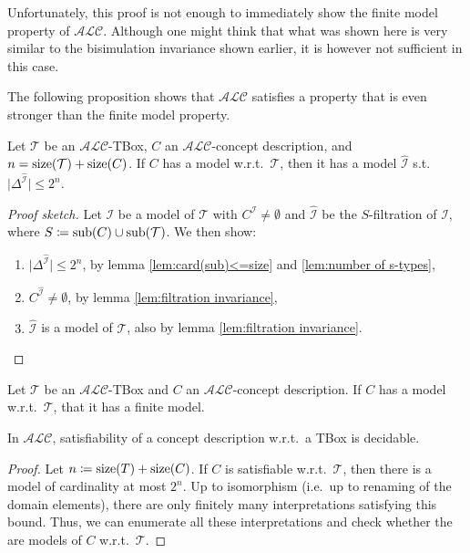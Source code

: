 Unfortunately, this proof is not enough to immediately show the finite model property of $\mathcal{ALC}$.
Although one might think that what was shown here is very similar to the bisimulation invariance shown earlier,
it is however not sufficient in this case.

The following proposition shows that $\mathcal{ALC}$ satisfies a property that is even stronger than the finite model property.
\begin{theorem}
	Let $\mathcal{T}$ be an $\mathcal{ALC}$-TBox, $C$ an $\mathcal{ALC}$-concept description, and $n = \operatorname{\text{size}}(\mathcal{T}) + \operatorname{\text{size}}(C)$.
	If $C$ has a model w.r.t.\ $\mathcal{T}$, then it has a model $\widehat{\mathcal{I}}$ s.t. $\lvert \Delta^{\widehat{\mathcal{I}}} \rvert \leq 2^n$.
\end{theorem}
\begin{proof}[Proof sketch]
	Let $\mathcal{I}$ be a model of $\mathcal{T}$ with $C^{\mathcal{I}} \neq \emptyset$ and $\widehat{\mathcal{I}}$ be the $S$-filtration of $\mathcal{I}$,
	where $S \coloneqq \operatorname{\text{sub}}(C) \cup \operatorname{\text{sub}}(\mathcal{T})$.
	We then show:
	\begin{enumerate}
		\item $\lvert \Delta^{\widehat{\mathcal{I}}} \rvert \leq 2^{n}$, by lemma \ref{lem:card(sub)<=size} and \ref{lem:number of s-types},
		\item $C^{\widehat{\mathcal{I}}} \neq \emptyset$, by lemma \ref{lem:filtration invariance},
		\item $\widehat{\mathcal{I}}$ is a model of $\mathcal{T}$, also by lemma \ref{lem:filtration invariance}. \qedhere
	\end{enumerate}
\end{proof}

\begin{corollary}
	Let $\mathcal{T}$ be an $\mathcal{ALC}$-TBox and $C$ an $\mathcal{ALC}$-concept description.
	If $C$ has a model w.r.t.\ $\mathcal{T}$, that it has a finite model.
\end{corollary}

\begin{corollary}[Decidability]
	In $\mathcal{ALC}$, satisfiability of a concept description w.r.t.\ a TBox is decidable.
\end{corollary}
\begin{proof}
	Let $n \coloneqq \operatorname{\text{size}}(T) + \operatorname{\text{size}}(C)$.
	If $C$ is satisfiable w.r.t.\ $\mathcal{T}$, then there is a model of cardinality at most $2^{n}$.
	Up to isomorphism (i.e.\, up to renaming of the domain elements), there are only finitely many interpretations satisfying this bound.
	Thus, we can enumerate all these interpretations and check whether the are models of $C$ w.r.t.\ $\mathcal{T}$.
\end{proof}


